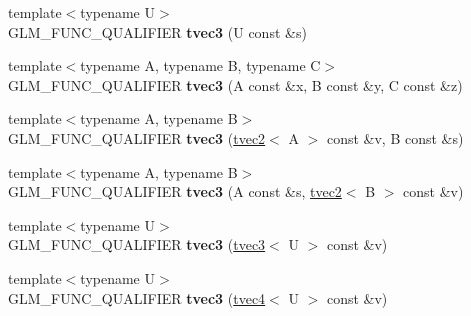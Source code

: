 \begin{DoxyCompactItemize}
\item 
\hypertarget{structglm_1_1detail_1_1tvec3_ab799aaa532aeb274dc35202fadee022e}{{\footnotesize template$<$typename U$>$ }\\G\-L\-M\-\_\-\-F\-U\-N\-C\-\_\-\-Q\-U\-A\-L\-I\-F\-I\-E\-R {\bfseries tvec3} (U const \&s)}\label{structglm_1_1detail_1_1tvec3_ab799aaa532aeb274dc35202fadee022e}

\item 
\hypertarget{structglm_1_1detail_1_1tvec3_a58cebfa4b0aa77d2923392ec2ffa5914}{{\footnotesize template$<$typename A, typename B, typename C$>$ }\\G\-L\-M\-\_\-\-F\-U\-N\-C\-\_\-\-Q\-U\-A\-L\-I\-F\-I\-E\-R {\bfseries tvec3} (A const \&x, B const \&y, C const \&z)}\label{structglm_1_1detail_1_1tvec3_a58cebfa4b0aa77d2923392ec2ffa5914}

\item 
\hypertarget{structglm_1_1detail_1_1tvec3_a93e0eda59eb310d83f8f73622689c9e8}{{\footnotesize template$<$typename A, typename B$>$ }\\G\-L\-M\-\_\-\-F\-U\-N\-C\-\_\-\-Q\-U\-A\-L\-I\-F\-I\-E\-R {\bfseries tvec3} (\hyperlink{structglm_1_1detail_1_1tvec2}{tvec2}$<$ A $>$ const \&v, B const \&s)}\label{structglm_1_1detail_1_1tvec3_a93e0eda59eb310d83f8f73622689c9e8}

\item 
\hypertarget{structglm_1_1detail_1_1tvec3_a21b10c8625726235dbdcfdcf27a0bcf2}{{\footnotesize template$<$typename A, typename B$>$ }\\G\-L\-M\-\_\-\-F\-U\-N\-C\-\_\-\-Q\-U\-A\-L\-I\-F\-I\-E\-R {\bfseries tvec3} (A const \&s, \hyperlink{structglm_1_1detail_1_1tvec2}{tvec2}$<$ B $>$ const \&v)}\label{structglm_1_1detail_1_1tvec3_a21b10c8625726235dbdcfdcf27a0bcf2}

\item 
\hypertarget{structglm_1_1detail_1_1tvec3_a7f0a51d91dfe21ce2b6f1b19406e8fea}{{\footnotesize template$<$typename U$>$ }\\G\-L\-M\-\_\-\-F\-U\-N\-C\-\_\-\-Q\-U\-A\-L\-I\-F\-I\-E\-R {\bfseries tvec3} (\hyperlink{structglm_1_1detail_1_1tvec3}{tvec3}$<$ U $>$ const \&v)}\label{structglm_1_1detail_1_1tvec3_a7f0a51d91dfe21ce2b6f1b19406e8fea}

\item 
\hypertarget{structglm_1_1detail_1_1tvec3_af1161d51dbbff4908afac43042b9a746}{{\footnotesize template$<$typename U$>$ }\\G\-L\-M\-\_\-\-F\-U\-N\-C\-\_\-\-Q\-U\-A\-L\-I\-F\-I\-E\-R {\bfseries tvec3} (\hyperlink{structglm_1_1detail_1_1tvec4}{tvec4}$<$ U $>$ const \&v)}\label{structglm_1_1detail_1_1tvec3_af1161d51dbbff4908afac43042b9a746}


\end{DoxyCompactItemize}
